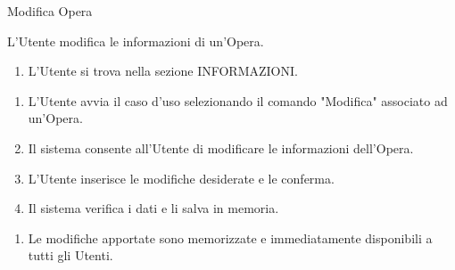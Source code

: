 {\ucExtTable	%
{	%
	Modifica Opera
	
}{	%
	
}{	%
	L'Utente modifica le informazioni di un'Opera.
	
}{	%
	\attori
	
}{	%
	\begin{enumerate}
        \item L'Utente si trova nella sezione INFORMAZIONI.
    \end{enumerate}
	
}{	%
	\begin{enumerate}
        \item L'Utente avvia il caso d'uso selezionando il comando "Modifica" associato ad un'Opera.
        \item Il sistema consente all'Utente di modificare le informazioni dell'Opera.
        \item L'Utente inserisce le modifiche desiderate e le conferma.
        \item Il sistema verifica i dati e li salva in memoria.
    \end{enumerate}
	
}{	%
	\begin{enumerate}
        \item Le modifiche apportate sono memorizzate e immediatamente disponibili a tutti gli Utenti.
    \end{enumerate}
	
} }

